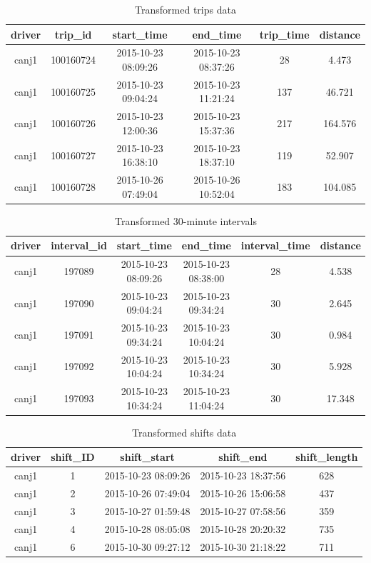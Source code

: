 \documentclass[12pt]{book}
\numberwithin{equation}{chapter}
\begin{document}
\begin{longtable}{cccccc}
\caption{\label{tab:transformtrip}Transformed trips data}\\
\toprule
driver & trip\_id & start\_time & end\_time & trip\_time & distance\\
\midrule
canj1 & 100160724 & 2015-10-23 08:09:26 & 2015-10-23 08:37:26 & 28 & 4.473\\
canj1 & 100160725 & 2015-10-23 09:04:24 & 2015-10-23 11:21:24 & 137 & 46.721\\
canj1 & 100160726 & 2015-10-23 12:00:36 & 2015-10-23 15:37:36 & 217 & 164.576\\
canj1 & 100160727 & 2015-10-23 16:38:10 & 2015-10-23 18:37:10 & 119 & 52.907\\
canj1 & 100160728 & 2015-10-26 07:49:04 & 2015-10-26 10:52:04 & 183 & 104.085\\
\bottomrule
\end{longtable}

\begin{longtable}{cccccc}
\caption{\label{tab:tranform30interval}Transformed 30-minute intervals}\\
\toprule
driver & interval\_id & start\_time & end\_time & interval\_time & distance\\
\midrule
canj1 & 197089 & 2015-10-23 08:09:26 & 2015-10-23 08:38:00 & 28 & 4.538\\
canj1 & 197090 & 2015-10-23 09:04:24 & 2015-10-23 09:34:24 & 30 & 2.645\\
canj1 & 197091 & 2015-10-23 09:34:24 & 2015-10-23 10:04:24 & 30 & 0.984\\
canj1 & 197092 & 2015-10-23 10:04:24 & 2015-10-23 10:34:24 & 30 & 5.928\\
canj1 & 197093 & 2015-10-23 10:34:24 & 2015-10-23 11:04:24 & 30 & 17.348\\
\bottomrule
\end{longtable}

\begin{table}[H]

\caption{\label{tab:transformshift}Transformed shifts data}
\centering
\begin{tabular}{ccccc}
\toprule
driver & shift\_ID & shift\_start & shift\_end & shift\_length\\
\midrule
canj1 & 1 & 2015-10-23 08:09:26 & 2015-10-23 18:37:56 & 628\\
canj1 & 2 & 2015-10-26 07:49:04 & 2015-10-26 15:06:58 & 437\\
canj1 & 3 & 2015-10-27 01:59:48 & 2015-10-27 07:58:56 & 359\\
canj1 & 4 & 2015-10-28 08:05:08 & 2015-10-28 20:20:32 & 735\\
canj1 & 6 & 2015-10-30 09:27:12 & 2015-10-30 21:18:22 & 711\\
\bottomrule
\end{tabular}
\end{table}
\end{document}
